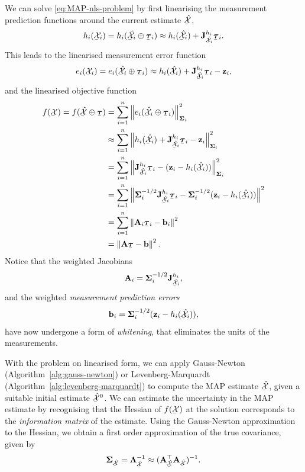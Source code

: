 We can solve \eqref{eq:MAP-nls-problem} by first linearising the measurement prediction functions around the current estimate $\ubar{\hat{\cX}}$,
\begin{equation}
  h_i(\ubar{\cX}_i) = h_i(\ubar{\hat{\cX}}_i \oplus \ubar{\vectau}_i) \approx h_i(\ubar{\hat{\cX}}_i) + \jac{h_i}{\ubar{\hat{\cX}}_i} \ubar{\vectau}_i.
\end{equation}
This leads to the linearised measurement error function
\begin{equation}
  e_i(\ubar{\cX}_i) = e_i(\ubar{\hat{\cX}}_i \oplus \ubar{\vectau}_i) \approx h_i(\ubar{\hat{\cX}}_i) + \jac{h_i}{\ubar{\hat{\cX}}_i} \ubar{\vectau}_i - \vecz_i,
\end{equation}
and the linearised objective function 
\begin{equation} \label{eq:MAP-linearised-objective-function}
\begin{split}
    f(\ubar{\cX}) = f(\ubar{\hat{\cX}} \oplus \ubar{\vectau}) &= \sum^n_{i=1} \norm{e_i(\ubar{\hat{\cX}}_i \oplus \ubar{\vectau}_i)}^2_{\matSigma_i}\\
    &\approx \sum^n_{i=1} \norm{h_i(\ubar{\hat{\cX}}_i) + \jac{h_i}{\ubar{\hat{\cX}}_i} \ubar{\vectau}_i - \vecz_i}^2_{\matSigma_i}\\
    &= \sum^n_{i=1} \norm{\jac{h_i}{\ubar{\hat{\cX}}_i} \ubar{\vectau}_i - (\vecz_i - h_i(\ubar{\hat{\cX}}_i))}^2_{\matSigma_i}\\
    &= \sum^n_{i=1} \norm{\matSigma^{-1/2}_i \jac{h_i}{\ubar{\hat{\cX}}_i} \ubar{\vectau}_i - \matSigma^{-1/2}_i(\vecz_i - h_i(\ubar{\hat{\cX}}_i))}^2\\
    &= \sum^n_{i=1} \norm{\matA_i \ubar{\vectau}_i - \vecb_i}^2\\
    &= \norm{\matA \ubar{\vectau} - \vecb}^2.
\end{split}
\end{equation}
Notice that the weighted Jacobians
\begin{equation}
  \matA_i = \matSigma^{-1/2}_i \jac{h_i}{\ubar{\hat{\cX}}_i},
\end{equation}
and the weighted \emph{measurement prediction errors}
\begin{equation}
  \vecb_i =  \matSigma^{-1/2}_i(\vecz_i - h_i(\ubar{\hat{\cX}}_i)),
\end{equation}
have now undergone a form of \emph{whitening}, that eliminates the units of the measurements.

With the problem on linearised form, we can apply Gauss-Newton (Algorithm~\ref{alg:gauss-newton}) or Levenberg-Marquardt (Algorithm~\ref{alg:levenberg-marquardt}) to compute the MAP estimate $\ubar{\hat{\cX}}$, given a suitable initial estimate $\ubar{\hat{\cX}}^0$.
We can estimate the uncertainty in the MAP estimate by recognising that the Hessian of $f(\ubar{\cX})$ at the solution corresponds to the \emph{information matrix} of the estimate.
Using the Gauss-Newton approximation to the Hessian, we obtain a first order approximation of the true covariance, given by
\begin{equation}
  \matSigma_{\ubar{\hat{\cX}}} = \matLambda_{\ubar{\hat{\cX}}}^{-1} \approx (\matA_{\ubar{\hat{\cX}}}\trans \matA_{\ubar{\hat{\cX}}})^{-1}.
\end{equation}

